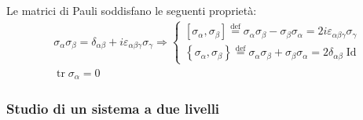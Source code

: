 \documentclass[10pt, a4paper]{scrartcl} %
\numberwithin{equation}{subsection}
\theoremstyle{style2}
\theoremstyle{style1}
\begin{document}
Le matrici di Pauli soddisfano le seguenti propriet\`a:
\begin{equation}
	\begin{split}
		&\sigma _\alpha  \sigma _\beta  = \delta _{\alpha  \beta}  + i \varepsilon _{\alpha \beta \gamma} \sigma _\gamma\Rightarrow \begin{cases}
			[\sigma _\alpha , \sigma _\beta ]\overset{\text{def}}{=} \sigma _\alpha \sigma _\beta  - \sigma _\beta \sigma _\alpha  = 2i \varepsilon _{\alpha  \beta  \gamma} \sigma _\gamma\\
\left\{ \sigma _\alpha  , \sigma _\beta  \right\} \overset{\text{def}}{=} \sigma _\alpha  \sigma _\beta  + \sigma _\beta  \sigma _\alpha = 2 \delta _{\alpha  \beta } \operatorname{Id}
		\end{cases}  \\
		& \operatorname{tr} \sigma _\alpha  = 0 
	\end{split}
\end{equation}
\subsubsection{Studio di un sistema a due livelli}
\end{document}
